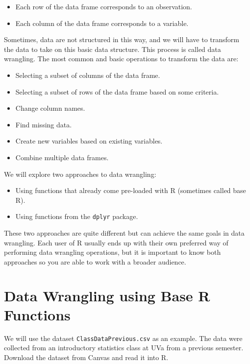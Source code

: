 \documentclass[
]{book}
\providecommand{\tightlist}{%
  \setlength{\itemsep}{0pt}\setlength{\parskip}{0pt}}
\begin{document}
\begin{itemize}
\tightlist
\item
  Each row of the data frame corresponds to an observation.
\item
  Each column of the data frame corresponds to a variable.
\end{itemize}

Sometimes, data are not structured in this way, and we will have to transform the data to take on this basic data structure. This process is called data wrangling. The most common and basic operations to transform the data are:

\begin{itemize}
\tightlist
\item
  Selecting a subset of columns of the data frame.
\item
  Selecting a subset of rows of the data frame based on some criteria.
\item
  Change column names.
\item
  Find missing data.
\item
  Create new variables based on existing variables.
\item
  Combine multiple data frames.
\end{itemize}

We will explore two approaches to data wrangling:

\begin{itemize}
\tightlist
\item
  Using functions that already come pre-loaded with R (sometimes called base R).
\item
  Using functions from the \texttt{dplyr} package.
\end{itemize}

These two approaches are quite different but can achieve the same goals in data wrangling. Each user of R usually ends up with their own preferred way of performing data wrangling operations, but it is important to know both approaches so you are able to work with a broader audience.

\hypertarget{data-wrangling-using-base-r-functions}{%
\section{Data Wrangling using Base R Functions}\label{data-wrangling-using-base-r-functions}}

We will use the dataset \texttt{ClassDataPrevious.csv} as an example. The data were collected from an introductory statistics class at UVa from a previous semester. Download the dataset from Canvas and read it into R.
\end{document}
